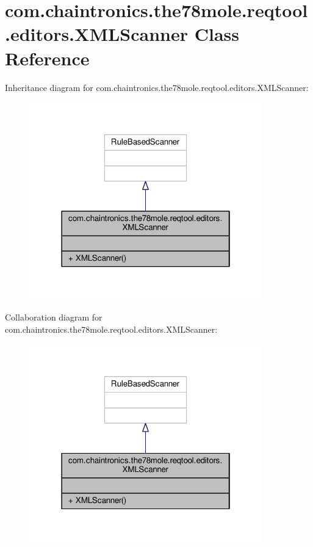 \hypertarget{classcom_1_1chaintronics_1_1the78mole_1_1reqtool_1_1editors_1_1XMLScanner}{}\section{com.\+chaintronics.\+the78mole.\+reqtool.\+editors.\+X\+M\+L\+Scanner Class Reference}
\label{classcom_1_1chaintronics_1_1the78mole_1_1reqtool_1_1editors_1_1XMLScanner}


Inheritance diagram for com.\+chaintronics.\+the78mole.\+reqtool.\+editors.\+X\+M\+L\+Scanner\+:\nopagebreak
\begin{figure}[H]
\begin{center}
\leavevmode
\includegraphics[width=286pt]{d5/d88/classcom_1_1chaintronics_1_1the78mole_1_1reqtool_1_1editors_1_1XMLScanner__inherit__graph}
\end{center}
\end{figure}


Collaboration diagram for com.\+chaintronics.\+the78mole.\+reqtool.\+editors.\+X\+M\+L\+Scanner\+:\nopagebreak
\begin{figure}[H]
\begin{center}
\leavevmode
\includegraphics[width=286pt]{df/d2c/classcom_1_1chaintronics_1_1the78mole_1_1reqtool_1_1editors_1_1XMLScanner__coll__graph}
\end{center}
\end{figure}
